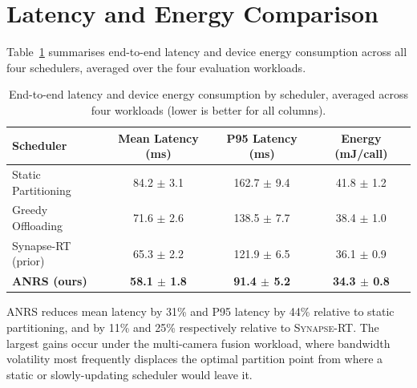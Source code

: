 \section{Latency and Energy Comparison}

Table~\ref{tab:results} summarises end-to-end latency and device energy consumption across all four schedulers, averaged over the four evaluation workloads.

\begin{table}[htbp]
\centering
\caption{End-to-end latency and device energy consumption by scheduler, averaged across four workloads (lower is better for all columns).}
\label{tab:results}
\small
\setlength{\tabcolsep}{3pt}
\begin{tabular}{@{}lccc@{}}
\toprule
\textbf{Scheduler} & \textbf{Mean Latency (ms)} & \textbf{P95 Latency (ms)} & \textbf{Energy (mJ/call)} \\
\midrule
Static Partitioning & 84.2 $\pm$ 3.1 & 162.7 $\pm$ 9.4 & 41.8 $\pm$ 1.2 \\
Greedy Offloading   & 71.6 $\pm$ 2.6 & 138.5 $\pm$ 7.7 & 38.4 $\pm$ 1.0 \\
Synapse-RT (prior)  & 65.3 $\pm$ 2.2 & 121.9 $\pm$ 6.5 & 36.1 $\pm$ 0.9 \\
\rowcolor{hkupale}
\textbf{ANRS (ours)} & \textbf{58.1 $\pm$ 1.8} & \textbf{91.4 $\pm$ 5.2} & \textbf{34.3 $\pm$ 0.8} \\
\bottomrule
\end{tabular}
\end{table}

ANRS reduces mean latency by 31\% and P95 latency by 44\% relative to static partitioning, and by 11\% and 25\% respectively relative to \textsc{Synapse-RT}. The largest gains occur under the multi-camera fusion workload, where bandwidth volatility most frequently displaces the optimal partition point from where a static or slowly-updating scheduler would leave it.
